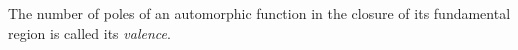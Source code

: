 The number of poles of an automorphic function in the closure of its fundamental region is called its \textit{valence}.